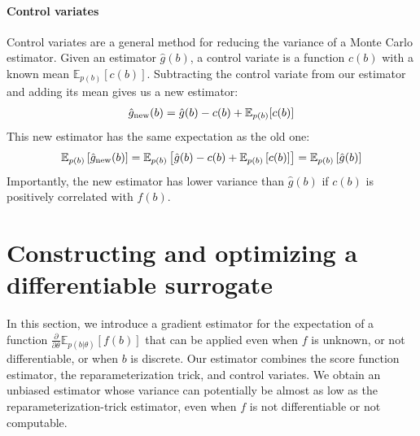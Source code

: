 \documentclass{article}
\newcommand{\controlf}{c}  %
\newcommand{\E}{\mathbb{E}}
\newcommand{\PT}{\frac{\partial}{\partial \theta}}
\begin{document}
\paragraph{Control variates}
Control variates are a general method for reducing the variance of a Monte Carlo estimator.
Given an estimator $\hat g(b)$, a control variate is a function $\controlf(b)$ with a known mean $\mathbb{E}_{p(b)} [ \controlf(b) ]$.
Subtracting the control variate from our estimator and adding its mean gives us a new estimator:
%
\begin{align}
\hat g_\textnormal{new}(b) = \hat g(b) - \controlf(b) + \mathbb{E}_{p(b)}[\controlf(b)]
\end{align}
%
This new estimator has the same expectation as the old one:
%
\begin{align}
\mathbb{E}_{p(b)}\left[\hat g_\textnormal{new}(b) \right] 
= \mathbb{E}_{p(b)}\left[\hat g(b) - \controlf(b) + \mathbb{E}_{p(b)} \left[ \controlf(b) \right] \right]
= \mathbb{E}_{p(b)}\left[ \hat g(b) \right]
\end{align}
%
Importantly, the new estimator has lower variance than $\hat g(b)$ if $\controlf(b)$ is positively correlated with $f(b)$.

\section{Constructing and optimizing a differentiable surrogate}
\label{lax section}
In this section, we introduce a gradient estimator for the expectation of a function $\PT \E_{p(b|\theta)}[f(b)]$ that can be applied even when $f$ is unknown, or not differentiable, or when $b$ is discrete.
Our estimator combines the score function estimator, the reparameterization trick, and control variates.
We obtain an unbiased estimator whose variance can potentially be almost as low as the reparameterization-trick estimator, even when $f$ is not differentiable or not computable.
\end{document}
